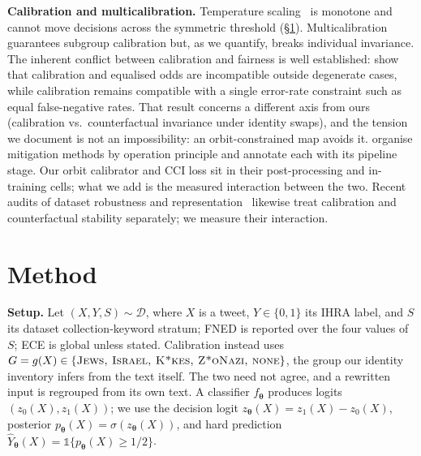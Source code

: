 \documentclass[11pt]{article}
\newcommand{\Indi}{\mathds{1}}
\newcommand{\bth}{{\boldsymbol{\theta}}}
\begin{document}
\textbf{Calibration and multicalibration.} Temperature scaling~\citep{guo2017calibration} is monotone and cannot move decisions across the symmetric threshold (\S\ref{sec:method}). Multicalibration~\citep{hebertjohnson2018multicalibration} guarantees subgroup calibration but, as we quantify, breaks individual invariance. The inherent conflict between calibration and fairness is well established: \citet{pleiss2017fairness} show that calibration and equalised odds are incompatible outside degenerate cases, while calibration remains compatible with a single error-rate constraint such as equal false-negative rates. That result concerns a different axis from ours (calibration vs.\ counterfactual invariance under identity swaps), and the tension we document is not an impossibility: an orbit-constrained map avoids it. \citet{fillies2025taxonomy} organise mitigation methods by operation principle and annotate each with its pipeline stage. Our orbit calibrator and CCI loss sit in their post-processing and in-training cells; what we add is the measured interaction between the two. Recent audits of dataset robustness and representation~\citep{antypas2023robust,korre2023harmful,tonneau2024languages} likewise treat calibration and counterfactual stability separately; we measure their interaction.

\section{Method}
\label{sec:method}

\textbf{Setup.} Let $(X, Y, S) \sim \mathcal{D}$, where $X$ is a tweet, $Y \in \{0,1\}$ its IHRA label, and $S$ its dataset collection-keyword stratum; FNED is reported over the four values of $S$; ECE is global unless stated. Calibration instead uses $G = g(X) \in \{\textsc{Jews, Israel, K*kes, Z*oNazi, none}\}$, the group our identity inventory infers from the text itself. The two need not agree, and a rewritten input is regrouped from its own text. A classifier $f_\bth$ produces logits $(z_0(X), z_1(X))$; we use the decision logit $z_\bth(X) = z_1(X) - z_0(X)$, posterior $p_\bth(X) = \sigma(z_\bth(X))$, and hard prediction $\hat Y_\bth(X) = \Indi\{p_\bth(X) \ge 1/2\}$.
\end{document}
